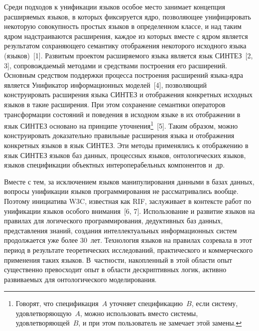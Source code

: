 \begin{multicols}{2}
Среди подходов к унификации языков особое место занимает концепция расширяемых 
языков, в которых фиксируется ядро, позволяющее унифицировать некоторую 
совокупность простых языков в определенном классе, и над таким ядром надстраиваются 
расширения, каждое из которых вместе с ядром является результатом сохраняющего 
семантику отображения некоторого исходного языка (языков)~[1]. Развитым проектом 
расширяемого языка является язык СИНТЕЗ~[2, 3], со\-про\-вож\-да\-емый методами и 
средствами построения его расширений. Основным сред\-ст\-вом поддержки процесса 
построения расширений языка-ядра является Унификатор информационных моделей~[4], 
поз\-во\-ля\-ющий конструировать расширения языка СИНТЕЗ и отображения конкретных 
исходных языков в такие расширения. При этом сохранение семантики операторов 
трансформации состояний и поведения в исходном языке в их отображении в язык СИНТЕЗ 
основано на принципе уточнения\footnote{Говорят, что спецификация~$A$ уточняет 
спецификацию~$B$, если систему, удовлетворяющую~$A$, можно использовать вместо 
системы, удовлетворяющей~$B$, и при этом пользователь не замечает этой замены.}~[5]. 
Таким образом, можно конструировать доказательно правильные расширения языка и 
отображения конкретных языков в язык СИНТЕЗ. Эти методы применялись к отображению 
в язык СИНТЕЗ языков баз данных, процессных языков, онтологических языков, языков 
спецификации объектных интероперабельных компонентов и~др.

Вместе с тем, за исключением языков манипулирования данными в базах данных, вопросы 
унификации языков программирования не рас\-смат\-ри\-ва\-лись вообще. Поэтому инициатива 
W3C, известная как RIF, заслуживает в контексте работ по 
унификации языков особого внимания~[6, 7]. Использование и развитие языков на 
правилах для логического программирования, дедуктивных баз данных, представления 
знаний, создания интеллектуальных информационных систем продолжается уже более 
30~лет. Технология языков на правилах созревала в этот период в результате 
теоретических исследований, практического и коммерческого применения таких языков. 
В~част\-ности, накопленный в этой об\-ласти опыт существенно превосходит опыт в области 
дескриптивных логик, активно развиваемых для онтологического моделирования.


\end{multicols}

